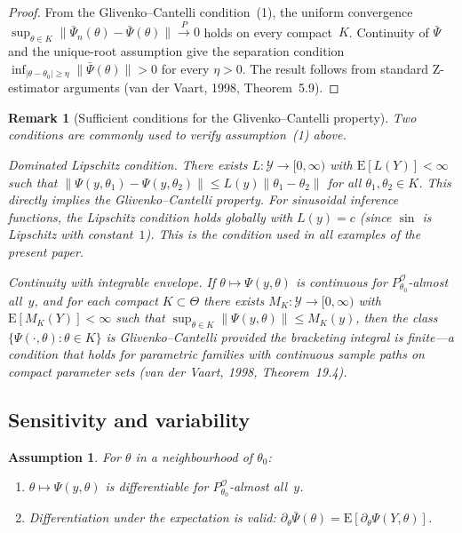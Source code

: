 \documentclass[11pt,a4paper]{article}
\newtheorem{remark}[theorem]{Remark}
\newtheorem{assumption}[theorem]{Assumption}
\newcommand{\E}{\mathrm{E}}
\begin{document}
\begin{proof}
From the Glivenko--Cantelli condition~(1), the uniform convergence
$\sup_{\theta \in K}\|\bar\Psi_n(\theta) - \bar\Psi(\theta)\|
\xrightarrow{P} 0$ holds on every compact~$K$.  Continuity of
$\bar\Psi$ and the unique-root assumption give the separation condition
$\inf_{|\theta - \theta_0| \geq \eta} \|\bar\Psi(\theta)\| > 0$ for
every $\eta > 0$.  The result follows from standard Z-estimator arguments
(van der Vaart, 1998, Theorem~5.9).
\end{proof}

\begin{remark}[Sufficient conditions for the Glivenko--Cantelli property]\label{rem:GC-sufficient}
Two conditions are commonly used to verify assumption~(1) above.

\emph{Dominated Lipschitz condition.}  There exists
$L : \mathcal Y \to [0, \infty)$ with $\E[L(Y)] < \infty$ such that
$\|\Psi(y, \theta_1) - \Psi(y, \theta_2)\| \leq L(y)\|\theta_1 - \theta_2\|$
for all $\theta_1, \theta_2 \in K$.  This directly implies the
Glivenko--Cantelli property.  For sinusoidal inference functions, the
Lipschitz condition holds globally with $L(y) = c$ (since $\sin$ is
Lipschitz with constant~$1$).  This is the condition used in all
examples of the present paper.

\emph{Continuity with integrable envelope.}  If $\theta \mapsto
\Psi(y, \theta)$ is continuous for $P_{\theta_0}^{\mathcal O}$-almost
all~$y$, and for each compact $K \subset \Theta$ there exists
$M_K : \mathcal Y \to [0, \infty)$ with $\E[M_K(Y)] < \infty$ such that
$\sup_{\theta \in K}\|\Psi(y,\theta)\| \leq M_K(y)$, then the class
$\{\Psi(\cdot,\theta) : \theta \in K\}$ is Glivenko--Cantelli provided
the bracketing integral is finite---a condition that holds for parametric
families with continuous sample paths on compact parameter sets
(van der Vaart, 1998, Theorem~19.4).
\end{remark}

\subsection{Sensitivity and variability}\label{subsec:SV}

\begin{assumption}\label{ass:diff}
For $\theta$ in a neighbourhood of $\theta_0$:
\begin{enumerate}
\item $\theta \mapsto \Psi(y, \theta)$ is differentiable for
$P_{\theta_0}^{\mathcal O}$-almost all~$y$.

\item Differentiation under the expectation is valid:
$\partial_\theta \bar\Psi(\theta)
= \E[\partial_\theta \Psi(Y, \theta)]$.
\end{enumerate}
\end{assumption}
\end{document}
